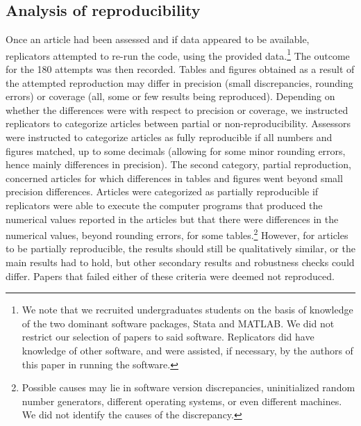 \documentclass{cje} %
\theoremstyle{plain}%
\theoremstyle{definition}
\theoremstyle{remark}
\begin{document}
\subsection{Analysis of reproducibility}



Once an article had been assessed and if data appeared to be available, replicators attempted to re-run the code, using the provided data.\footnote{We note that we recruited undergraduates students on the basis of knowledge of the two dominant software packages, Stata and MATLAB. We did not restrict our selection of papers to said software. Replicators did have knowledge of other software, and were assisted, if necessary, by the authors of this paper in running the software. } The outcome for the 180 attempts was then recorded. 
%
Tables and figures obtained as a result of the attempted reproduction may differ in precision (small discrepancies, rounding errors) or coverage (all, some or few results being reproduced). Depending on whether the differences were with respect to precision or coverage, we instructed replicators to categorize articles between partial or non-reproducibility. Assessors were instructed to categorize articles as fully reproducible if all numbers and figures matched, up to some decimals (allowing for some minor rounding errors, hence mainly differences in precision). The second category, partial reproduction, concerned articles for which differences in tables and figures went beyond small precision differences. Articles were categorized as partially reproducible if replicators were able to execute the computer programs that produced the numerical values reported in the articles but that there were differences in the numerical values, beyond rounding errors, for some tables.\footnote{Possible causes may lie in software version discrepancies, uninitialized random number generators, different operating systems, or even different machines. We did not identify the causes of the discrepancy.} However, for articles to be partially reproducible, the results should still be qualitatively similar, or the main results had to hold, but other secondary results and robustness checks could differ. Papers that failed either of these criteria were deemed not reproduced.
\end{document}
